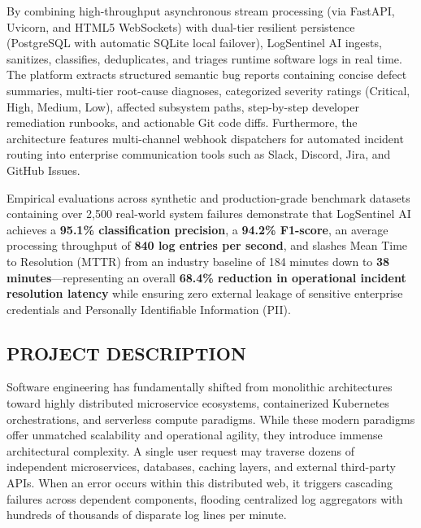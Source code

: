 \documentclass[12pt,a4paper]{article}
\begin{document}
By combining high-throughput asynchronous stream processing (via FastAPI, Uvicorn, and HTML5 WebSockets) with dual-tier resilient persistence (PostgreSQL with automatic SQLite local failover), LogSentinel AI ingests, sanitizes, classifies, deduplicates, and triages runtime software logs in real time. The platform extracts structured semantic bug reports containing concise defect summaries, multi-tier root-cause diagnoses, categorized severity ratings (Critical, High, Medium, Low), affected subsystem paths, step-by-step developer remediation runbooks, and actionable Git code diffs. Furthermore, the architecture features multi-channel webhook dispatchers for automated incident routing into enterprise communication tools such as Slack, Discord, Jira, and GitHub Issues.

Empirical evaluations across synthetic and production-grade benchmark datasets containing over 2,500 real-world system failures demonstrate that LogSentinel AI achieves a \textbf{95.1\% classification precision}, a \textbf{94.2\% F1-score}, an average processing throughput of \textbf{840 log entries per second}, and slashes Mean Time to Resolution (MTTR) from an industry baseline of 184 minutes down to \textbf{38 minutes}---representing an overall \textbf{68.4\% reduction in operational incident resolution latency} while ensuring zero external leakage of sensitive enterprise credentials and Personally Identifiable Information (PII).

\clearpage
\subsection{PROJECT DESCRIPTION}\label{sec:proj_desc}
Software engineering has fundamentally shifted from monolithic architectures toward highly distributed microservice ecosystems, containerized Kubernetes orchestrations, and serverless compute paradigms. While these modern paradigms offer unmatched scalability and operational agility, they introduce immense architectural complexity. A single user request may traverse dozens of independent microservices, databases, caching layers, and external third-party APIs. When an error occurs within this distributed web, it triggers cascading failures across dependent components, flooding centralized log aggregators with hundreds of thousands of disparate log lines per minute.
\end{document}
